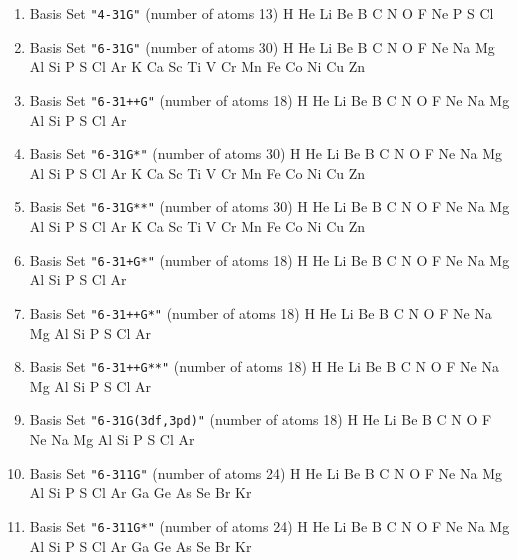 \begin{enumerate}
\item Basis Set \verb#"4-31G"# (number of atoms 13)  \newline 
  H He Li Be B C N O F Ne P S Cl


\item Basis Set \verb#"6-31G"# (number of atoms 30)  \newline 
  H He Li Be B C N O F Ne Na Mg Al Si P S Cl Ar K Ca Sc Ti V Cr Mn
 Fe Co Ni Cu Zn


\item Basis Set \verb#"6-31++G"# (number of atoms 18)  \newline 
  H He Li Be B C N O F Ne Na Mg Al Si P S Cl Ar


\item Basis Set \verb#"6-31G*"# (number of atoms 30)  \newline 
  H He Li Be B C N O F Ne Na Mg Al Si P S Cl Ar K Ca Sc Ti V Cr Mn
 Fe Co Ni Cu Zn


\item Basis Set \verb#"6-31G**"# (number of atoms 30)  \newline 
  H He Li Be B C N O F Ne Na Mg Al Si P S Cl Ar K Ca Sc Ti V Cr Mn
 Fe Co Ni Cu Zn


\item Basis Set \verb#"6-31+G*"# (number of atoms 18)  \newline 
  H He Li Be B C N O F Ne Na Mg Al Si P S Cl Ar


\item Basis Set \verb#"6-31++G*"# (number of atoms 18)  \newline 
  H He Li Be B C N O F Ne Na Mg Al Si P S Cl Ar


\item Basis Set \verb#"6-31++G**"# (number of atoms 18)  \newline 
  H He Li Be B C N O F Ne Na Mg Al Si P S Cl Ar


\item Basis Set \verb#"6-31G(3df,3pd)"# (number of atoms 18)  \newline 
  H He Li Be B C N O F Ne Na Mg Al Si P S Cl Ar


\item Basis Set \verb#"6-311G"# (number of atoms 24)  \newline 
  H He Li Be B C N O F Ne Na Mg Al Si P S Cl Ar Ga Ge As Se Br Kr


\item Basis Set \verb#"6-311G*"# (number of atoms 24)  \newline 
  H He Li Be B C N O F Ne Na Mg Al Si P S Cl Ar Ga Ge As Se Br Kr



\end{enumerate}
